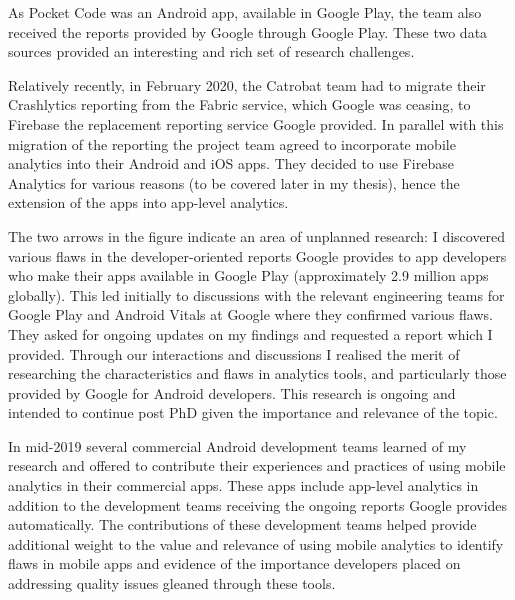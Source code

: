 As Pocket Code was an Android app, available in Google Play, the team also received the reports provided by Google through Google Play. These two data sources provided an interesting and rich set of research challenges. 

Relatively recently, in February 2020, the Catrobat team had to migrate their Crashlytics reporting from the Fabric service, which Google was ceasing, to Firebase the replacement reporting service Google provided. In parallel with this migration of the reporting the project team agreed to incorporate mobile analytics into their Android and iOS apps. They decided to use Firebase Analytics for various reasons (to be covered later in my thesis), hence the extension of the apps into app-level analytics.

The two arrows in the figure indicate an area of unplanned research: 
%
I discovered various flaws in the developer-oriented reports Google provides to app developers who make their apps available in Google Play (approximately 2.9 million apps globally). This led initially to discussions with the relevant engineering teams for Google Play and Android Vitals at Google where they confirmed various flaws. They asked for ongoing updates on my findings and requested a report which I provided. Through our interactions and discussions I realised the merit of researching the characteristics and flaws in analytics tools, and particularly those provided by Google for Android developers. This research is ongoing and intended to continue post PhD given the importance and relevance of the topic.

In mid-2019 several commercial Android development teams learned of my research and offered to contribute their experiences and practices of using mobile analytics in their commercial apps. These apps include app-level analytics in addition to the development teams receiving the ongoing reports Google provides automatically. The contributions of these development teams helped provide additional weight to the value and relevance of using mobile analytics to identify flaws in mobile apps and evidence of the importance developers placed on addressing quality issues gleaned through these tools.



